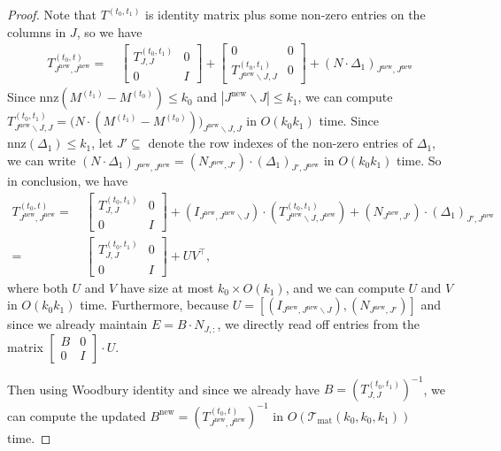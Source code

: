 \documentclass[11pt]{article}
\newcommand{\Tmat}{\mathcal{T}_{\mathrm{mat}}}
\newcommand{\nnz}{\mathrm{nnz}}
\newcommand{\new}{\mathrm{new}}
\newcommand\BB{\boldsymbol{\mathit{B}}}
\newcommand\EE{\boldsymbol{\mathit{E}}}
\newcommand\II{\boldsymbol{\mathit{I}}}
\newcommand\NN{\boldsymbol{\mathit{N}}}
\newcommand\MM{\boldsymbol{\mathit{M}}}
\newcommand\TT{\boldsymbol{\mathit{T}}}
\newcommand\UU{\boldsymbol{\mathit{U}}}
\newcommand\VV{\boldsymbol{\mathit{V}}}
\begin{document}
\begin{proof}
Note that $\TT^{(t_0,t_1)}$ is identity matrix plus some non-zero entries on the columns in $J$, so we have
\begin{align*}
\TT^{(t_0,t)}_{J^{\new},J^{\new}} = &~
\begin{bmatrix}
\TT^{(t_0,t_1)}_{J,J} & 0 \\
0 & \II
\end{bmatrix} + 
\begin{bmatrix}
0 & 0 \\
\TT^{(t_0,t_1)}_{J^{\new} \backslash J, J} & 0
\end{bmatrix} + (\NN \cdot \Delta_1)_{J^{\new}, J^{\new}}
\end{align*}
Since $\nnz(\MM^{(t_1)}-\MM^{(t_0)}) \leq k_0$ and $|J^{\new} \backslash J| \leq k_1$, we can compute $\TT^{(t_0,t_1)}_{J^{\new} \backslash J, J} = \big(\NN \cdot (\MM^{(t_1)}-\MM^{(t_0)})\big)_{J^{\new} \backslash J, J}$ in $O(k_0 k_1)$ time. Since $\nnz(\Delta_1) \leq k_1$, let $J' \subseteq $ denote the row indexes of the non-zero entries of $\Delta_1$, we can write $(\NN \cdot \Delta_1)_{J^{\new}, J^{\new}} = (\NN_{J^{\new}, J'}) \cdot (\Delta_1)_{J', J^{\new}}$ in $O(k_0 k_1)$ time. 
So in conclusion, we have
\begin{align*}
\TT^{(t_0,t)}_{J^{\new},J^{\new}} = &~ \begin{bmatrix}
\TT^{(t_0,t_1)}_{J,J} & 0 \\
0 & \II
\end{bmatrix} + (\II_{J^{\new}, J^{\new}\backslash J}) \cdot (\TT^{(t_0,t_1)}_{J^{\new} \backslash J, J^{\new}}) + (\NN_{J^{\new}, J'}) \cdot (\Delta_1)_{J', J^{\new}} \\
= &~ \begin{bmatrix}
\TT^{(t_0,t_1)}_{J,J} & 0 \\
0 & \II
\end{bmatrix} + \UU \VV^{\top},
\end{align*}
where both $\UU$ and $\VV$ have size at most $k_0 \times O(k_1)$, and we can compute $\UU$ and $\VV$ in $O(k_0 k_1)$ time. Furthermore, because $\UU = [(\II_{J^{\new}, J^{\new}\backslash J}), (\NN_{J^{\new}, J'})]$ and since we already maintain $\EE = \BB \cdot \NN_{J,:}$, we directly read off entries from the matrix $\begin{bmatrix}
\BB & 0 \\
0 & \II
\end{bmatrix} \cdot \UU$.


Then using Woodbury identity and since we already have $\BB = (\TT^{(t_0,t_1)}_{J,J})^{-1}$, we can compute the updated $\BB^{\new} = (\TT^{(t_0,t)}_{J^{\new},J^{\new}})^{-1}$ in $O(\Tmat(k_0, k_0, k_1))$ time. 


\end{proof}
\end{document}
